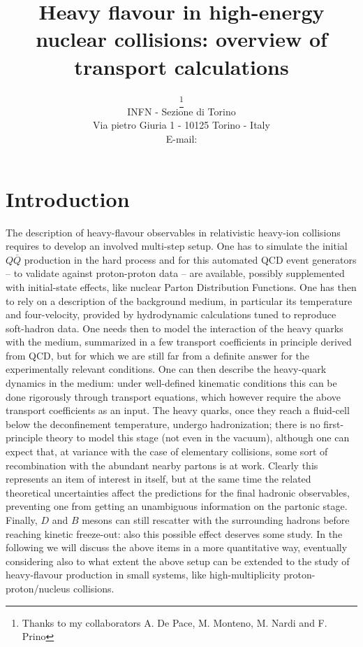 \documentclass{PoS}
\title{Heavy flavour in high-energy nuclear collisions: overview of transport calculations}
\author{\speaker{Andrea Beraudo}\thanks{Thanks to my collaborators A. De Pace, M. Monteno, M. Nardi and F. Prino}\\
        INFN - Sezione di Torino\\
        Via pietro Giuria 1 - 10125 Torino - Italy\\
        E-mail: \email{beraudo@to.infn.it}}
\begin{document}
\section{Introduction}
The description of heavy-flavour observables in relativistic heavy-ion collisions requires to develop an involved multi-step setup. One has to simulate the initial $Q\overline{Q}$ production in the hard process and for this automated QCD event generators -- to validate against proton-proton data -- are available, possibly supplemented with initial-state effects, like nuclear Parton Distribution Functions. One has then to rely on a description of the background medium, in particular its temperature and four-velocity, provided by hydrodynamic calculations tuned to reproduce soft-hadron data. One needs then to model the interaction of the heavy quarks with the medium, summarized in a few transport coefficients in principle derived from QCD, but for which we are still far from a definite answer for the experimentally relevant conditions. One can then describe the heavy-quark dynamics in the medium: under well-defined kinematic conditions this can be done rigorously through transport equations, which however require the above transport coefficients as an input. The heavy quarks, once they reach a fluid-cell below the deconfinement temperature, undergo hadronization; there is no first-principle theory to model this stage (not even in the vacuum), although one can expect that, at variance with the case of elementary collisions, some sort of recombination with the abundant nearby partons is at work. Clearly this represents an item of interest in itself, but at the same time the related theoretical uncertainties affect the predictions for the final hadronic observables, preventing one from getting an unambiguous information on the partonic stage. Finally, $D$ and $B$ mesons can still rescatter with the surrounding hadrons before reaching kinetic freeze-out: also this possible effect deserves some study.
In the following we will discuss the above items in a more quantitative way, eventually considering also to what extent the above setup can be extended to the study of heavy-flavour production in small systems, like high-multiplicity proton-proton/nucleus collisions.
\end{document}
